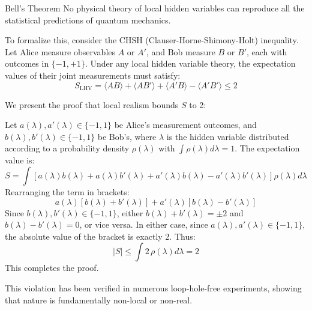 \begin{theorembox}{Bell's Theorem}
No physical theory of local hidden variables can reproduce all the statistical predictions of quantum mechanics.
\end{theorembox}

To formalize this, consider the CHSH (Clauser-Horne-Shimony-Holt) inequality. Let Alice measure observables \(A\) or \(A'\), and Bob measure \(B\) or \(B'\), each with outcomes in \(\{-1, +1\}\).
Under any local hidden variable theory, the expectation values of their joint measurements must satisfy:
\[
S_{\text{LHV}} = \langle A B \rangle + \langle A B' \rangle + \langle A' B \rangle - \langle A' B' \rangle \leq 2
\]


We present the proof that local realism bounds \(S\) to 2:

\begin{proofbox}
Let \(a(\lambda), a'(\lambda) \in \{-1, 1\}\) be Alice's measurement outcomes, and \(b(\lambda), b'(\lambda) \in \{-1, 1\}\) be Bob's, where \(\lambda\) is the hidden variable distributed according to a probability density \(\rho(\lambda)\) with \(\int \rho(\lambda) d\lambda = 1\).
The expectation value is:
\[
S = \int \left[ a(\lambda)b(\lambda) + a(\lambda)b'(\lambda) + a'(\lambda)b(\lambda) - a'(\lambda)b'(\lambda) \right] \rho(\lambda) d\lambda
\]
Rearranging the term in brackets:
\[
a(\lambda) \left[ b(\lambda) + b'(\lambda) \right] + a'(\lambda) \left[ b(\lambda) - b'(\lambda) \right]
\]
Since \(b(\lambda), b'(\lambda) \in \{-1, 1\}\), either \(b(\lambda) + b'(\lambda) = \pm 2\) and \(b(\lambda) - b'(\lambda) = 0\), or vice versa.
In either case, since \(a(\lambda), a'(\lambda) \in \{-1, 1\}\), the absolute value of the bracket is exactly 2.
Thus:
\[
|S| \leq \int 2 \, \rho(\lambda) d\lambda = 2
\]
This completes the proof.
\end{proofbox}

This violation has been verified in numerous loop-hole-free experiments, showing that nature is fundamentally non-local or non-real.
